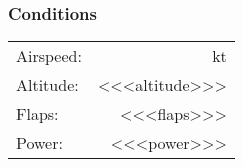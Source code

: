 % 
% 
%
 \subsubsection*{Conditions}
 \noindent\begin{tabular}{p{1.5 in}r}
 Airspeed:&\theTrimSpeed{} kt\\
 Altitude:&<<<altitude>>>\\
 Flaps:&<<<flaps>>>\\
 Power:&<<<power>>>\\
 \end{tabular}
